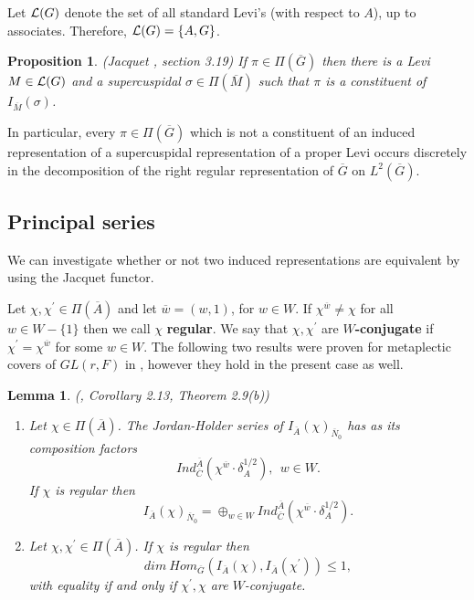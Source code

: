 \documentclass[twocolumn,10pt]{article}
\newtheorem{lemma}[theorem]{Lemma}
\newtheorem{proposition}[theorem]{Proposition}
\begin{document}
Let ${\cal L}(G)$ denote the set of all standard Levi's 
(with respect to
$A$), up to associates. Therefore, ${\cal L}(G)=\{A,G\}$.

\begin{proposition}
(Jacquet \cite{BZ1}, section 3.19)
If $\pi \in \Pi (\overline{G})$ then
there is a Levi $M\in {\cal L}(G)$ and a supercuspidal
$\sigma \in \Pi (\overline{M})$
such that $\pi $ is a constituent of 
$I_{\overline{M}}(\sigma )$.
\end{proposition}

In particular, every $\pi \in \Pi (\overline{G})$ which is not a
constituent of an induced representation of a supercuspidal 
representation of a
proper Levi occurs discretely in the decomposition 
of the right regular
representation of $\overline{G}$ on $L^2(\overline{G})$.

\subsection{Principal series}

We can investigate whether or not two induced representations 
are equivalent
by using the Jacquet functor. 

Let $\chi ,\chi ^{\prime }\in \Pi (\overline{A})$ and let
$\overline{w}=(w,1)$, for $w\in W$. 
If $\chi ^{\overline{w}}\not
=\chi $ for all $w\in W-\{1\}$ then we call $\chi $ 
{\bf regular}. We say
that $\chi ,\chi ^{\prime }$ are {\bf $W$-conjugate} 
if $\chi ^{\prime}
=\chi ^{\overline{w}}$ for some $w\in W$. The following two 
results were proven for
metaplectic covers of $GL(r,F)$ in \cite{KP}, however they hold in the
present case as well.

\begin{lemma}
(\cite{BZ2}, Corollary 2.13, Theorem 2.9(b))
\label{lemma:bz2}
\begin{enumerate}
\item[(a)]
 Let $\chi \in \Pi (\overline{A})$. The
Jordan-Holder series of 
$I_{\overline{A}}(\chi )_{\overline{N}_0}$ has as its
composition factors 
\[
Ind_{\overline{C}}^{\overline{A}}(\chi ^{\overline{w}}\cdot
\delta _{A}^{1/2}),\ \
w\in W.
\]
If $\chi $ is regular then 
\[
I_{\overline{A}}(\chi )_{\overline{N}_0}=
\oplus _{w\in W}Ind_{\overline{C}}^{\overline{A}}
(\chi^{\overline{w}}\cdot \delta _{A}^{1/2}).
\]

\item[(b)] 
Let $\chi ,\chi ^{\prime }\in \Pi (\overline{A})$.
If $\chi $ is regular then 
\[
dim\ Hom_{\overline{G}}(I_{\overline{A}}(\chi ),
I_{\overline{A}}(\chi ^{\prime }))\leq 1,
\]
with equality if and only if $\chi ^{\prime },\chi $ 
are $W$-conjugate.
\end{enumerate}
\end{lemma}
\end{document}
